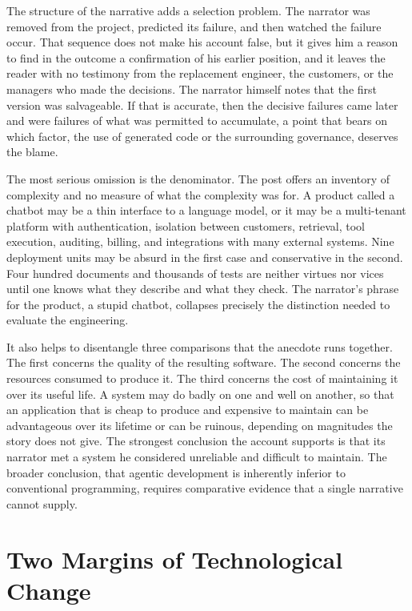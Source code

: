 \documentclass[11pt]{article}
\theoremstyle{remark}
\begin{document}
The structure of the narrative adds a selection problem. The narrator was removed from the project, predicted its failure, and then watched the failure occur. That sequence does not make his account false, but it gives him a reason to find in the outcome a confirmation of his earlier position, and it leaves the reader with no testimony from the replacement engineer, the customers, or the managers who made the decisions. The narrator himself notes that the first version was salvageable. If that is accurate, then the decisive failures came later and were failures of what was permitted to accumulate, a point that bears on which factor, the use of generated code or the surrounding governance, deserves the blame.

The most serious omission is the denominator. The post offers an inventory of complexity and no measure of what the complexity was for. A product called a chatbot may be a thin interface to a language model, or it may be a multi-tenant platform with authentication, isolation between customers, retrieval, tool execution, auditing, billing, and integrations with many external systems. Nine deployment units may be absurd in the first case and conservative in the second. Four hundred documents and thousands of tests are neither virtues nor vices until one knows what they describe and what they check. The narrator's phrase for the product, a stupid chatbot, collapses precisely the distinction needed to evaluate the engineering.

It also helps to disentangle three comparisons that the anecdote runs together. The first concerns the quality of the resulting software. The second concerns the resources consumed to produce it. The third concerns the cost of maintaining it over its useful life. A system may do badly on one and well on another, so that an application that is cheap to produce and expensive to maintain can be advantageous over its lifetime or can be ruinous, depending on magnitudes the story does not give. The strongest conclusion the account supports is that its narrator met a system he considered unreliable and difficult to maintain. The broader conclusion, that agentic development is inherently inferior to conventional programming, requires comparative evidence that a single narrative cannot supply.

\section{Two Margins of Technological Change}
\end{document}
